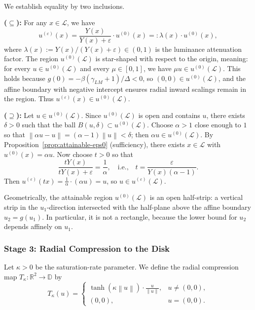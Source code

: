 \documentclass[11pt]{article}
\makeatletter
\theoremstyle{plain}
\theoremstyle{definition}
\theoremstyle{remark}
\renewenvironment{proof}[1][\proofname]{\par\pushQED{\qed}\normalfont
\topsep6\p@\@plus6\p@\relax
\trivlist\item[\hskip\labelsep\bfseries #1\@addpunct{.}]\mbox{}\\\ignorespaces}{\popQED\endtrivlist\@endpefalse}
\newcommand{\R}{\mathbb{R}}
\newcommand{\D}{\mathbb{D}}
\newcommand{\norm}[1]{\left\lVert #1 \right\rVert}
\makeatother
\begin{document}
\begin{proof}
We establish equality by two inclusions.

\textbf{($\subseteq$):} For any $x \in \mathcal{L}$, we have
\begin{equation}
u^{(\varepsilon)}(x) = \frac{Y(x)}{Y(x) + \varepsilon} \cdot u^{(0)}(x) =: \lambda(x) \cdot u^{(0)}(x),
\end{equation}
where $\lambda(x) := Y(x)/(Y(x) + \varepsilon) \in (0, 1)$ is the luminance attenuation factor. The region $u^{(0)}(\mathcal{L})$ is star-shaped with respect to the origin, meaning: for every $u \in u^{(0)}(\mathcal{L})$ and every $\mu \in [0,1]$, we have $\mu u \in u^{(0)}(\mathcal{L})$. This holds because $g(0) = -\beta(\gamma_{LM}+1)/\Delta < 0$, so $(0,0) \in u^{(0)}(\mathcal{L})$, and the affine boundary with negative intercept ensures radial inward scalings remain in the region. Thus $u^{(\varepsilon)}(x) \in u^{(0)}(\mathcal{L})$.

\textbf{($\supseteq$):} Let $u \in u^{(0)}(\mathcal{L})$. Since $u^{(0)}(\mathcal{L})$ is open and contains $u$, there exists $\delta > 0$ such that the ball $B(u, \delta) \subset u^{(0)}(\mathcal{L})$. Choose $\alpha > 1$ close enough to $1$ so that $\norm{\alpha u - u} = (\alpha - 1)\norm{u} < \delta$; then $\alpha u \in u^{(0)}(\mathcal{L})$. By Proposition~\ref{prop:attainable-eps0} (sufficiency), there exists $x \in \mathcal{L}$ with $u^{(0)}(x) = \alpha u$. Now choose $t > 0$ so that
\begin{equation}
\frac{tY(x)}{tY(x) + \varepsilon} = \frac{1}{\alpha}, \quad \text{i.e.,} \quad t = \frac{\varepsilon}{Y(x)(\alpha - 1)}.
\end{equation}
Then $u^{(\varepsilon)}(tx) = \frac{1}{\alpha} \cdot (\alpha u) = u$, so $u \in u^{(\varepsilon)}(\mathcal{L})$.
\end{proof}

Geometrically, the attainable region $u^{(0)}(\mathcal{L})$ is an open half-strip: a vertical strip in the $u_1$-direction intersected with the half-plane above the affine boundary $u_2 = g(u_1)$. In particular, it is not a rectangle, because the lower bound for $u_2$ depends affinely on $u_1$.

\subsubsection{Stage 3: Radial Compression to the Disk}

Let $\kappa > 0$ be the saturation-rate parameter. We define the radial compression map $T_\kappa: \R^2 \to \D$ by
\begin{equation}
\boxed{
T_\kappa(u) = \begin{cases}
\displaystyle \tanh(\kappa \norm{u}) \cdot \frac{u}{\norm{u}}, & u \neq (0,0), \\[0.8em]
(0,0), & u = (0,0).
\end{cases}
}
\end{equation}
\end{document}
